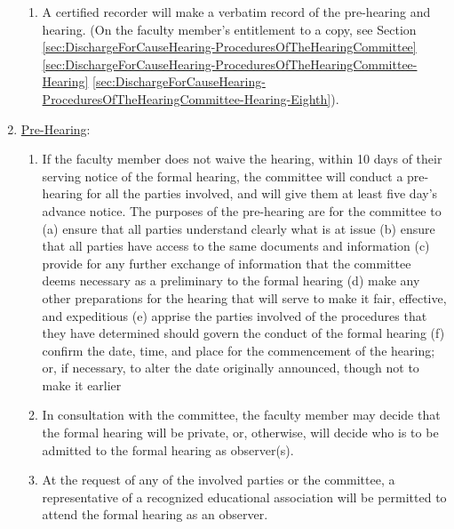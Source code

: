 \begin{enumerate}[label=\alph*)]
{\begin{enumerate}[label=\arabic*)]
								\item{
									\label{sec:DischargeForCauseHearing-ProceduresOfTheHearingCommittee-ProceduralConditions-Fifth}
									A certified recorder will make a verbatim record of the pre-hearing and hearing.
									(On the faculty member's entitlement to a copy, see Section
									\ref{sec:DischargeForCauseHearing-ProceduresOfTheHearingCommittee}
									\ref{sec:DischargeForCauseHearing-ProceduresOfTheHearingCommittee-Hearing}
									\ref{sec:DischargeForCauseHearing-ProceduresOfTheHearingCommittee-Hearing-Eighth}).
								}
							\end{enumerate}
						}
						\item{\underline{Pre-Hearing}:
							\label{sec:DischargeForCauseHearing-ProceduresOfTheHearingCommittee-PreHearing}
							\begin{enumerate}[label=\arabic*)]
								\item{If the faculty member does not waive the hearing, within 10 days of their serving notice of the formal hearing, the committee will conduct a pre-hearing for all the parties involved, and will give them at least five day's advance notice.  The purposes of the pre-hearing are for the committee to}
								(a) ensure that all parties understand clearly what is at issue
								(b) ensure that all parties have access to the same documents and information
								(c) provide for any further exchange of information that the committee deems necessary as a preliminary to the formal hearing
								(d) make any other preparations for the hearing that will serve to make it fair, effective, and expeditious
								(e) apprise the parties involved of the procedures that they have determined should govern the conduct of the formal hearing
								(f) confirm the date, time, and place for the commencement of the hearing; or, if necessary, to alter the date originally announced, though not to make it earlier
								\item{
									\label{sec:DischargeForCauseHearing-ProceduresOfTheHearingCommittee-PreHearing-Second}
									In consultation with the committee, the faculty member may decide that the formal hearing will be private, or, otherwise, will decide who is to be admitted to the formal hearing as observer(s).}
								\item{At the request of any of the involved parties or the committee, a representative of a recognized educational association will be permitted to attend the formal hearing as an observer.}
							\end{enumerate}
}
\end{enumerate}
